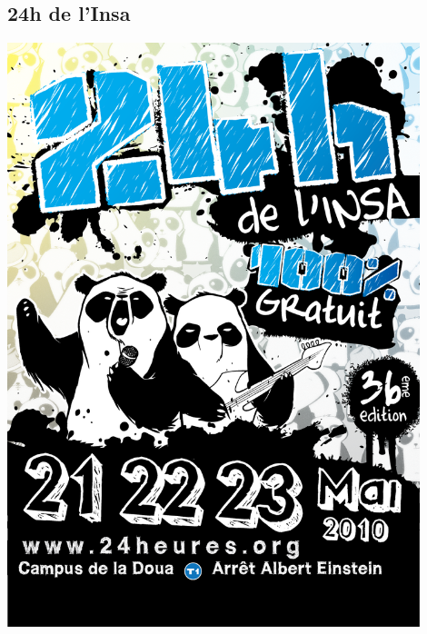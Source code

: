     \subsection{24h de l'Insa}
        \includegraphics[width=0.9\textwidth]{img/affiche_concert.png}
